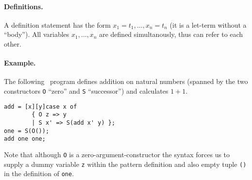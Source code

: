 \paragraph*{Definitions.}
A definition statement has the form $x_1 = t_1, \dots, x_n = t_n$ (it
is a let-term without a ``body''). All variables $x_1, \dots, x_n$ are
defined simultanously, thus can refer to each other.

\paragraph*{Example.} The following \foetus\ program defines addition
on natural numbers (spanned by the two constructors {\tt O} ``zero'' and
{\tt S} ``successor'') and calculates $1+1$.

\begin{verbatim}
add = [x][y]case x of
        { O z => y
        | S x' => S(add x' y) };
one = S(O());
add one one;
\end{verbatim}

Note that although {\tt O} is a zero-argument-constructor the syntax
forces us to supply a dummy variable {\tt z} within the pattern
definition and also empty tuple {\tt ()} in the definition of {\tt one}.

